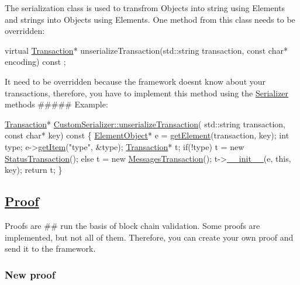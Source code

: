 The serialization class is used to transfrom Objects into string using Elements and strings into Objects using Elements. One method from this class needs to be overridden\+: 
\begin{DoxyCode}
\textcolor{keyword}{virtual} \mbox{\hyperlink{classTransaction}{Transaction}}* unserializeTransaction(std::string transaction, \textcolor{keyword}{const} \textcolor{keywordtype}{char}* encoding) \textcolor{keyword}{const}
      ;
\end{DoxyCode}
 It need to be overridden because the framework doesn\textquotesingle{}t know about your transactions, therefore, you have to implement this method using the \mbox{\hyperlink{classSerializer}{Serializer}} methods \#\#\#\#\# Example\+: 
\begin{DoxyCode}
\mbox{\hyperlink{classTransaction}{Transaction}}* \mbox{\hyperlink{classCustomSerializer_abff58f1a955c2f399127b7e3cae23223}{CustomSerializer::unserializeTransaction}}(
      std::string transaction, \textcolor{keyword}{const} \textcolor{keywordtype}{char}* key)\textcolor{keyword}{ const }\{
    \mbox{\hyperlink{classElementObject}{ElementObject}}* e = \mbox{\hyperlink{classSerializer_ab3bcdbd49167109de13e03878337018a}{getElement}}(transaction, key);
    \textcolor{keywordtype}{int} type;
    e->\mbox{\hyperlink{classElementObject_a7b3a1ef505e63d87ad39309c5ae1b5b3}{getItem}}(\textcolor{stringliteral}{"type"}, \&type);
    \mbox{\hyperlink{classTransaction}{Transaction}}* t;
    \textcolor{keywordflow}{if}(!type)
        t = \textcolor{keyword}{new} \mbox{\hyperlink{classStatusTransaction}{StatusTransaction}}();
    \textcolor{keywordflow}{else}
        t = \textcolor{keyword}{new} \mbox{\hyperlink{classMessagesTransaction}{MessagesTransaction}}();
    t->\mbox{\hyperlink{classComponent_a28212595f8ee85fe009bd233bc99b2fc}{\_\_init\_\_}}(e, \textcolor{keyword}{this}, key);
    \textcolor{keywordflow}{return} t;
\}
\end{DoxyCode}
 \subsection*{\mbox{\hyperlink{classProof}{Proof}}}

Proofs are \#\# run the basis of block chain validation. Some proofs are implemented, but not all of them. Therefore, you can create your own proof and send it to the framework. \subsubsection*{New proof}

